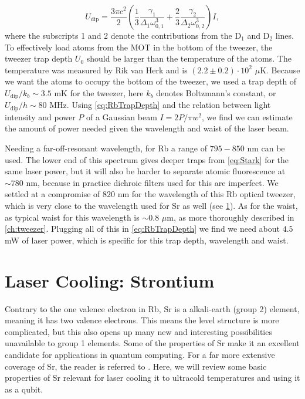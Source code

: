 \begin{equation}\label{eq:RbTrapDepth}
    U_{\text{dip}} = \frac{3\pi c^2}{2} \left(
    \frac{1}{3}\frac{\gamma_1}{\Delta_1 \omega_{0,1}^3} + \frac{2}{3}\frac{ \gamma_2}{\Delta_2 \omega_{0,2}^3} 
    \right) I,
\end{equation}
where the subscripts 1 and 2 denote the contributions from the D$_1$ and D$_2$ lines. 
To effectively load atoms from the MOT in the bottom of the tweezer, the tweezer trap depth $U_0$ should be larger than the temperature of the atoms. 
The temperature was measured by Rik van Herk \cite{Herk2022} and is $(2.2\pm0.2) \cdot 10^2$ $\mu$K.
Because we want the atoms to occupy the bottom of the tweezer, we used a trap depth of $U_{\text{dip}} /k_b \sim 3.5$ mK for the tweezer, here $k_b$ denotes Boltzmann's constant, or $U_{\text{dip}} / h \sim 80$ MHz.
Using \cref{eq:RbTrapDepth} and the relation between light intensity and power $P$ of a Gaussian beam $I = 2P/\pi w^2$, we find we can estimate the amount of power needed given the wavelength and waist of the laser beam. 

Needing a far-off-resonant wavelength, for Rb a range of $795 - 850$ nm can be used.
The lower end of this spectrum gives deeper traps from \cref{eq:Stark} for the same laser power, but it will also be harder to separate atomic fluorescence at $\sim 780$ nm, because in practice dichroic filters used for this are imperfect.
We settled at a compromise of $820$ nm for the wavelength of this Rb optical tweezer, which is very close to the wavelength used for Sr as well (see \cref{sec:Sr}). As for the waist, as typical waist for this wavelength is $\sim 0.8$ $\mu$m, as more thoroughly described in \cref{ch:tweezer}. Plugging all of this in \cref{eq:RbTrapDepth} we find we need about $4.5$ mW of laser power, which is specific for this trap depth, wavelength and waist.


\section{Laser Cooling: Strontium}\label{sec:Sr}

Contrary to the one valence electron in \ac{Rb}, \ac{Sr} is a alkali-earth (group 2) element, meaning it has two valence electrons.
This means the level structure is more complicated, but this also opens up many new and interesting possibilities unavailable to group 1 elements.
Some of the properties of Sr make it an excellent candidate for applications in quantum computing.
For a far more extensive coverage of Sr, the reader is referred to \cite{Stellmer2013}. 
Here, we will review some basic properties of Sr relevant for laser cooling it to ultracold temperatures and using it as a qubit.

